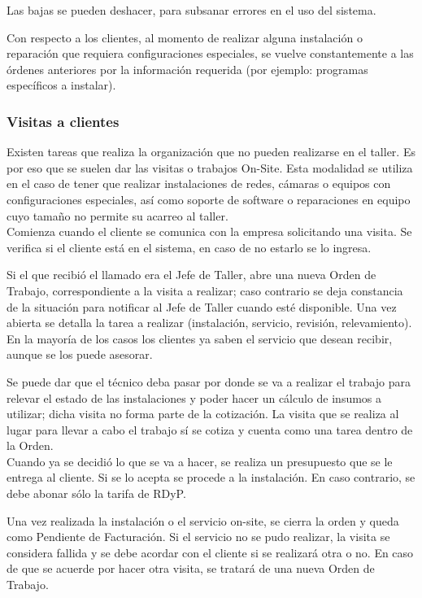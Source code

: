\documentclass[12pt]{extarticle}
\begin{document}
\begin{spacing}{1.2}
    Las bajas se pueden deshacer, para subsanar errores en el uso del sistema.

    Con respecto a los clientes, al momento de realizar alguna instalación o reparación que requiera configuraciones especiales, se vuelve constantemente a las órdenes anteriores por la información requerida (por ejemplo: programas específicos a instalar).

    \subsubsection{Visitas a clientes}

    Existen tareas que realiza la organización que no pueden realizarse en el taller. Es por eso que se suelen dar las visitas o trabajos On-Site. Esta modalidad se utiliza en el caso de tener que realizar instalaciones de redes, cámaras o equipos con configuraciones especiales, así como soporte de software o reparaciones en equipo cuyo tamaño no permite su acarreo al taller.\\

    Comienza cuando el cliente se comunica con la empresa solicitando una visita. Se verifica si el cliente está en el sistema, en caso de no estarlo se lo ingresa.

    Si el que recibió el llamado era el Jefe de Taller, abre una nueva Orden de Trabajo, correspondiente a la visita a realizar; caso contrario se deja constancia de la situación para notificar al Jefe de Taller cuando esté disponible. 
    Una vez abierta se detalla la tarea a realizar (instalación, servicio, revisión, relevamiento). En la mayoría de los casos los clientes ya saben el servicio que desean recibir, aunque se los puede asesorar.

    Se puede dar que el técnico deba pasar por donde se va a realizar el trabajo para relevar el estado de las instalaciones y poder hacer un cálculo de insumos a utilizar; dicha visita no forma parte de la cotización. La visita que se realiza al lugar para llevar a cabo el trabajo sí se cotiza y cuenta como una tarea dentro de la Orden.\\

    Cuando ya se decidió lo que se va a hacer, se realiza un presupuesto que se le entrega al cliente. Si se lo acepta se procede a la instalación. En caso contrario, se debe abonar sólo la tarifa de RDyP.

    Una vez realizada la instalación o el servicio on-site, se cierra la orden y queda como Pendiente de Facturación. Si el servicio no se pudo realizar, la visita se considera fallida y se debe acordar con el cliente si se realizará otra o no. En caso de que se acuerde por hacer otra visita, se tratará de una nueva Orden de Trabajo.\\ 


\end{spacing}
\end{document}

